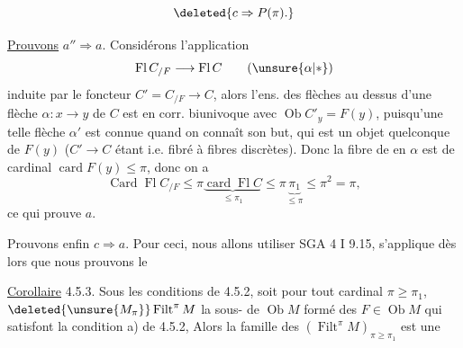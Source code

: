 \[
\deleted{c\Rightarrow P(\pi).}
\]

\uline{Prouvons} $a''\Rightarrow a$. Considérons l'application
\[
\operatorname{Fl} C_{/F}\longrightarrow\operatorname{Fl} C\tag*{(\unsure{\(\alpha\)|\(\ast\)})}
\]
induite par le foncteur  $C'=C_{/F}\longrightarrow C$, alors l'ens. des flèches au dessus d'une flèche $\alpha:x\longrightarrow y$ de $C$ est  en corr. biunivoque avec $\operatorname{Ob} C'_y=F(y)$, puisqu'une telle flèche $\alpha'$ est connue quand on connaît son but, qui est un objet quelconque de $F(y)$ ($C'\longrightarrow C$ étant  i.e. fibré à fibres discrètes). Donc la fibre de \unsure{(\(\alpha\))|(\(\ast\))} en $\alpha$ est  de cardinal \deleted{$\leq$} $\operatorname{card} F(y)\leq\pi$, donc on a
\[
\operatorname{Card}\operatorname{Fl} C_{/F}\leq\pi\underbrace{\operatorname{card}\operatorname{Fl} C}_{\leq\pi_1}
\leq\pi\underbrace{\pi_1}_{\leq\pi}\leq\pi^2=\pi,
\]
ce qui prouve $a$.

Prouvons enfin $c\Rightarrow a$. Pour ceci, nous allons utiliser  SGA 4 I 9.15,  s'applique dès lors que nous prouvons le

\uline{Corollaire} 4.5.3. Sous les conditions de 4.5.2, soit \deleted{\unsure{,}} pour tout cardinal $\pi\geq\pi_1$, $\deleted{\unsure{M_\pi}}\operatorname{Filt}^{\pi}M$ la sous-\uline{}  de $\operatorname{Ob} M$ formé des $F\in\operatorname{Ob}M$  qui satisfont la condition a) de 4.5.2, Alors la famille des $(\operatorname{Filt}^{\pi}M)_{\pi\geq\pi_1}$ est une
